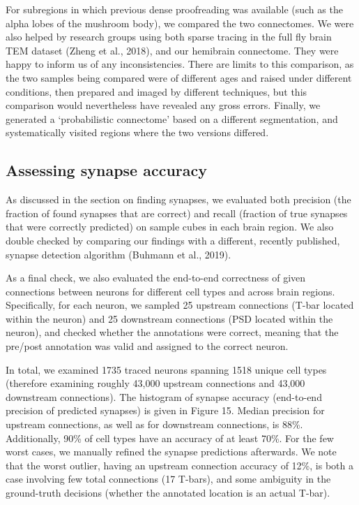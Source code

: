 \documentclass{article}
\begin{document}
For subregions in which previous dense proofreading was available (such as the alpha lobes of the mushroom body), we compared the two connectomes. We were also helped by research groups using both sparse tracing in the full fly brain TEM dataset (Zheng et al., 2018), and our hemibrain connectome. They were happy to inform us of any inconsistencies. There are limits to this comparison, as the two samples being compared were of different ages and raised under different conditions, then prepared and imaged by different techniques, but this comparison would nevertheless have revealed any gross errors. Finally, we generated a ‘probabilistic connectome’ based on a different segmentation, and systematically visited regions where the two versions differed.

\subsection*{Assessing synapse accuracy}

As discussed in the section on finding synapses, we evaluated both precision (the fraction of found synapses that are correct) and recall (fraction of true synapses that were correctly predicted) on sample cubes in each brain region. We also double checked by comparing our findings with a different, recently published, synapse detection algorithm (Buhmann et al., 2019).

As a final check, we also evaluated the end-to-end correctness of given connections between neurons for different cell types and across brain regions. Specifically, for each neuron, we sampled 25 upstream connections (T-bar located within the neuron) and 25 downstream connections (PSD located within the neuron), and checked whether the annotations were correct, meaning that the pre/post annotation was valid and assigned to the correct neuron.


In total, we examined 1735 traced neurons spanning 1518 unique cell types (therefore examining roughly 43,000 upstream connections and 43,000 downstream connections). The histogram of synapse accuracy (end-to-end precision of predicted synapses) is given in Figure 15. Median precision for upstream connections, as well as for downstream connections, is 88\%. Additionally, 90\% of cell types have an accuracy of at least 70\%. For the few worst cases, we manually refined the synapse predictions afterwards. We note that the worst outlier, having an upstream connection accuracy of 12\%, is both a case involving few total connections (17 T-bars), and some ambiguity in the ground-truth decisions (whether the annotated location is an actual T-bar).
\end{document}
